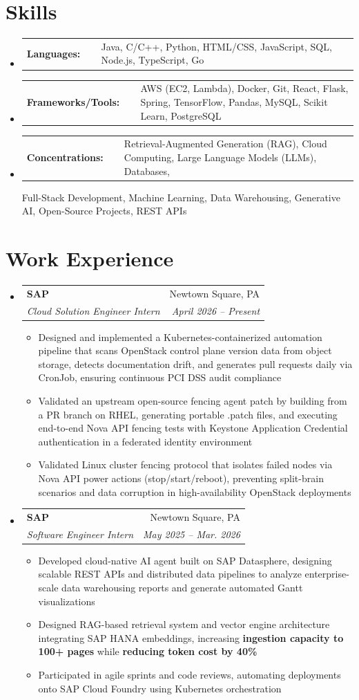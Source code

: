 \documentclass[letterpaper,10pt]{article}
\makeatletter
\newcommand{\rsection}[1]{
  \section{#1}
}
\newenvironment{rsectionlist}{
  \begin{itemize}[leftmargin=*, itemsep=0.75em, label={}]
}{
  \end{itemize}
  \vspace*{-1.5em}

}
\newcommand{\rsectionitem}[4]{
  \item \begin{tabular*}{0.98\textwidth}[t]{l@{\extracolsep{\fill}}r}
      \textbf{#1} & #2 \\
      \textit{#3} & \textit{\small #4}
    \end{tabular*}
}
\newenvironment{rlinelist}{
  \begin{itemize}[leftmargin=*, label={}]
  \setlength{\itemsep}{0pt}
  \setlength{\parskip}{2pt}
  \setlength{\parsep}{0pt}
}{
  \end{itemize}
  \vspace*{-1.5\baselineskip}
}
\newcommand{\rline}[2]{
  \item \begin{tabular*}{0.98\textwidth}{ll}
      \textbf{#1\ \ } & #2
    \end{tabular*}
}
\newenvironment{rpointlist}{
  \begin{itemize}
  \setlength{\itemsep}{0pt}
  \setlength{\parskip}{2pt}
  \setlength{\parsep}{0pt}
}{
  \end{itemize}
}
\newcommand{\rpointlone}[1]{
  \item \small{#1}
}
\newcommand{\highlight}[1]{\textbf{\small #1}}
\makeatother
\begin{document}
\rsection{Skills}
  \begin{rlinelist}
    \rline
      {Languages:}
      {Java, C/C++, Python, HTML/CSS, JavaScript, SQL, Node.js, TypeScript, Go}
    \rline
      {Frameworks/Tools:}
      {AWS (EC2, Lambda), Docker, Git, React, Flask, Spring, TensorFlow, Pandas, MySQL, Scikit Learn, PostgreSQL}
    \rline
      {Concentrations:}
      {Retrieval-Augmented Generation (RAG), Cloud Computing, Large Language Models (LLMs), Databases,}
      { Full-Stack Development, Machine Learning, Data Warehousing, Generative AI, Open-Source Projects, REST APIs}
  \end{rlinelist}

\rsection{Work Experience}
  \begin{rsectionlist}

  \rsectionitem
      {SAP}
      {Newtown Square, PA}
      {Cloud Solution Engineer Intern}
      {April 2026 -- Present}
      \begin{rpointlist}
        \rpointlone{Designed and implemented a Kubernetes-containerized automation pipeline that scans OpenStack control plane version data from object storage, detects documentation drift, and generates pull requests daily via CronJob, ensuring continuous PCI DSS audit compliance}
        \rpointlone{Validated an upstream open-source fencing agent patch by building from a PR branch on RHEL, generating portable .patch files, and executing end-to-end Nova API fencing tests with Keystone Application Credential authentication in a federated identity environment}
        \rpointlone{Validated Linux cluster fencing protocol that isolates failed nodes via Nova API power actions (stop/start/reboot), preventing split-brain scenarios and data corruption in high-availability OpenStack deployments}
    \end{rpointlist}

  \rsectionitem
      {SAP}
      {Newtown Square, PA}
      {Software Engineer Intern}
      {May 2025 -- Mar. 2026}
      \begin{rpointlist}
        \rpointlone{Developed cloud-native AI agent built on SAP Datasphere, designing scalable REST APIs and distributed data pipelines to analyze enterprise-scale data warehousing reports and generate automated Gantt visualizations}
        \rpointlone{Designed RAG-based retrieval system and vector engine architecture integrating SAP HANA embeddings, increasing \highlight{ingestion capacity to 100+ pages} while \highlight{reducing token cost by 40\%}}
        \rpointlone{Participated in agile sprints and code reviews, automating deployments onto SAP Cloud Foundry using Kubernetes orchestration}
      \end{rpointlist}


\end{rsectionlist}
\end{document}
